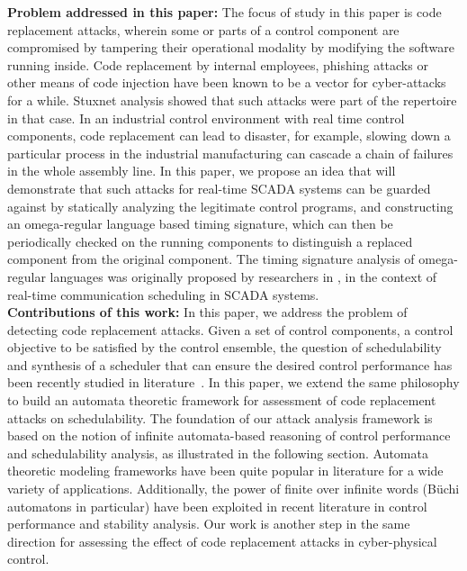 \noindent
{\bf Problem addressed in this paper:} The focus of study in this paper is code replacement attacks, wherein some or parts of a control component 
are compromised by tampering their operational modality 
by modifying the software running inside. 
Code replacement \cite{GhoshHD12} by internal employees, phishing attacks or other means of code injection
have been known to be a vector for cyber-attacks for a while. Stuxnet analysis showed that such
attacks were part of the repertoire in that case. In an industrial control environment with real time control components, code replacement can lead to disaster, for example, slowing down a
particular process in the industrial manufacturing can cascade a chain of failures in the whole
assembly line. In this paper, we propose an idea that will demonstrate that such
attacks for real-time SCADA systems can be guarded against by statically analyzing the
legitimate control programs, and constructing an omega-regular language based timing signature,
which can then be periodically checked on the running components to distinguish a replaced
component from the original component. The timing signature analysis of omega-regular languages was originally proposed by researchers in \cite{WeissFAA09}, in the context of real-time communication scheduling
in SCADA systems. \\

\noindent
{\bf Contributions of this work:}
In this paper, we address the problem of detecting code replacement attacks. Given a set of control components, a control objective 
to be satisfied by the control ensemble, the question of schedulability and 
synthesis of a scheduler that can ensure the desired control performance has been recently studied in literature~\cite{WeissFAA09, AlurW08, GhoshMDHD16}. 
In this paper, we extend the same philosophy to build an automata theoretic framework for assessment of code replacement attacks on schedulability. The foundation of our attack analysis framework is based on the notion of infinite automata-based reasoning of control performance and schedulability analysis, as illustrated in the following section. Automata theoretic modeling frameworks have been quite popular in literature for a wide variety of applications. Additionally, the power of finite over infinite words (B\"{u}chi automatons in particular) have been exploited in recent literature in control performance and stability analysis. Our work is another step in the same direction for assessing the effect of code replacement attacks in cyber-physical control. \\

